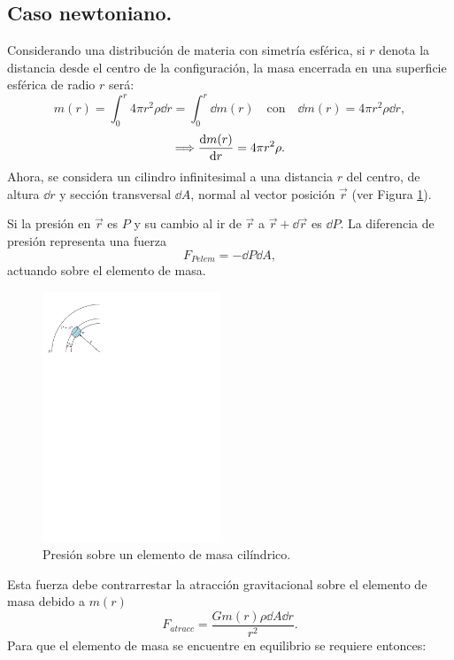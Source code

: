 \subsection{Caso newtoniano.}

\noindent Considerando una distribución de materia con simetría esférica, si $r$ denota la distancia desde el centro de la configuración, la masa encerrada en una superficie esférica de radio $r$ será:  
\begin{equation}
    m ( r ) = \int _ { 0 } ^ { r } 4 \pi r ^ { 2 } \rho \dd{r} = \int_{0}^{r} \dd{m(r)} \quad\text{con}\quad \dd{m(r)}=4\pi r^2\rho \dd{r},
    \label{mN}
\end{equation}
\begin{equation}
    \Longrightarrow\dv{m(r)}{r} =4\pi r^2 \rho.
    \label{dmnewton}
\end{equation}
Ahora, se considera un cilindro infinitesimal a una distancia $r$ del centro, de altura $\dd{r}$ y sección transversal $\dd{A}$, normal al vector posición $\vec{r}$ (ver Figura \ref{stellnew}).  

Si la presión en $\vec{r}$ es $P$ y su cambio al ir de $\vec{r}$ a $\vec{r}+\dd{\vec{r}}$ es $\dd{P}$. La diferencia de presión representa una fuerza 
\begin{equation*}
    F_{Pelem}=-\dd{P}\dd{A},
\end{equation*}
actuando sobre el elemento de masa.

\begin{figure}[H]
    \centering
    \includegraphics[width=150pt]{figures/stellarnewton.pdf}
    \caption[Presión sobre un elemento de masa cilíndrico]{Presión sobre un elemento de masa cilíndrico.}
    \label{stellnew}
\end{figure}
 Esta fuerza debe contrarrestar la atracción gravitacional sobre el elemento de masa debido a $m(r)$
\begin{equation*}
    F_{atracc}=\frac{G m(r)\rho \dd{A} \dd{r}}{r^2}.
\end{equation*}
Para que el elemento de masa se encuentre en equilibrio se requiere entonces:

